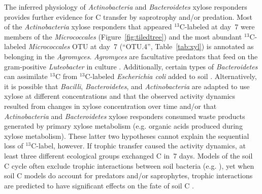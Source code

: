 The inferred physiology of \textit{Actinobacteria} and \textit{Bacteroidetes}
xylose responders provides further evidence for C transfer by
saprotrophy and/or predation. Most of the \textit{Actinobacteria} xylose
responders that appeared $^{13}$C-labeled at day~7 were members of the
\textit{Micrococcales} (Figure~\ref{fig:tiledtree}) and the most abundant
$^{13}$C-labeled \textit{Micrococcales} OTU at day~7 (“OTU.4”,
Table~\ref{tab:xyl}) is annotated as belonging in the \textit{Agromyces}.
\textit{Agromyces} are facultative predators that feed on the gram-positive
\textit{Luteobacter} in culture \citep{16346402}. Additionally, certain types
of \textit{Bacteroidetes} can assimilate $^{13}$C from $^{13}$C-labeled
\textit{Escherichia coli} added to soil \citep{Lueders2006}.
Alternatively, it is possible that \textit{Bacilli},
\textit{Bacteroidetes}, and \textit{Actinobacteria} are adapted to use
xylose at different concentrations and that the observed activity dynamics
resulted from changes in xylose concentration over time and/or that
\textit{Actinobacteria} and \textit{Bacteroidetes} xylose responders
consumed waste products generated by primary xylose metabolism (e.g.
organic acids produced during xylose metabolism). These latter two
hypotheses cannot explain the sequential loss of $^{13}$C-label, however.
If trophic transfer caused the activity dynamics, at least three different
ecological groups exchanged C in~7 days. Models of the soil C cycle often
exclude trophic interactions between soil bacteria (e.g.
\citep{Moore1988}), yet when soil C models do account for predators and/or
saprophytes, trophic interactions are predicted to have significant
effects on the fate of soil C \citep{Kaiser2014a}. 

